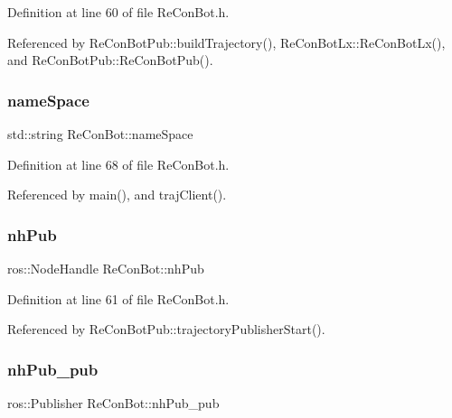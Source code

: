 Definition at line 60 of file Re\+Con\+Bot.\+h.



Referenced by Re\+Con\+Bot\+Pub\+::build\+Trajectory(), Re\+Con\+Bot\+Lx\+::\+Re\+Con\+Bot\+Lx(), and Re\+Con\+Bot\+Pub\+::\+Re\+Con\+Bot\+Pub().

\mbox{\label{class_re_con_bot_a40ca07cd606988b78664c4a52fd8dc59}} 
\subsubsection{\texorpdfstring{name\+Space}{nameSpace}}
{\footnotesize\ttfamily std\+::string Re\+Con\+Bot\+::name\+Space}



Definition at line 68 of file Re\+Con\+Bot.\+h.



Referenced by main(), and traj\+Client().

\mbox{\label{class_re_con_bot_a37edfe9c2dbbf37894c9bf850806fdd3}} 
\subsubsection{\texorpdfstring{nh\+Pub}{nhPub}}
{\footnotesize\ttfamily ros\+::\+Node\+Handle Re\+Con\+Bot\+::nh\+Pub\hspace{0.3cm}{\ttfamily [protected]}}



Definition at line 61 of file Re\+Con\+Bot.\+h.



Referenced by Re\+Con\+Bot\+Pub\+::trajectory\+Publisher\+Start().

\mbox{\label{class_re_con_bot_a549b7542d286b690f38b7ece8b83850b}} 
\subsubsection{\texorpdfstring{nh\+Pub\+\_\+pub}{nhPub\_pub}}
{\footnotesize\ttfamily ros\+::\+Publisher Re\+Con\+Bot\+::nh\+Pub\+\_\+pub\hspace{0.3cm}{\ttfamily [protected]}}



